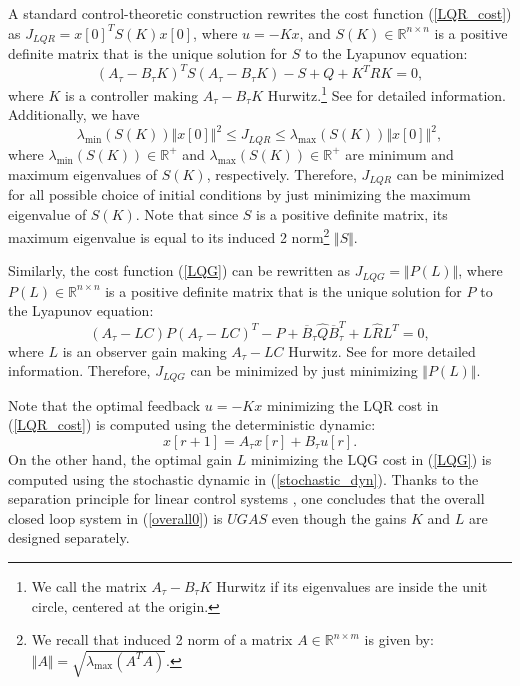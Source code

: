 \documentclass{amsart}
\numberwithin{equation}{section}
\newcommand{\R}{{\mathbb{R}}}
\begin{document}
A standard control-theoretic construction rewrites the cost function (\ref{LQR_cost}) as $J_{LQR}=x[0]^T S(K)x[0]$, where $u=-Kx$, and $S(K)\in\mathbb{R}^{n\times n}$ is a positive definite matrix that is the unique solution for $S$ to the Lyapunov equation:
\begin{equation}\label{lyapunov}
\left(A_\tau-B_\tau K\right)^TS\left(A_\tau-B_\tau K\right)-S+Q+K^TRK=0,
\end{equation}
where $K$ is a controller making $A_\tau-B_\tau K$ Hurwitz.\footnote{
We call the matrix $A_\tau-B_\tau K$ Hurwitz if its eigenvalues are inside the unit circle, centered at the origin.} 
See \cite{joao} for detailed information. Additionally, we have
\begin{equation}
\lambda_{\min}(S(K))\Vert{x[0]}\Vert^2\leq{J_{LQR}}\leq\lambda_{\max}(S(K))\Vert{x[0]}\Vert^2,
\end{equation}
where $\lambda_{\min}(S(K))\in\R^+$ and $\lambda_{\max}(S(K))\in\R^+$ are minimum and maximum eigenvalues of $S(K)$, respectively. 
Therefore, $J_{LQR}$ can be minimized for all possible choice of initial conditions by just minimizing the maximum eigenvalue of $S(K)$. Note that since $S$ is a positive definite matrix, its maximum eigenvalue is equal to its induced 2 norm\footnote{We recall that induced 2 norm of a matrix $A\in\R^{n\times{m}}$ is given by: $\Vert{A}\Vert=\sqrt{\lambda_{\max}\left(A^TA\right)}$.} $\Vert{S}\Vert$.  

Similarly, the cost function (\ref{LQG}) can be rewritten as $J_{LQG}=\Vert{P(L)}\Vert$, where $P(L)\in\mathbb{R}^{n\times n}$ is a positive definite matrix that is the unique solution for $P$ to the Lyapunov equation:
\begin{equation}\label{lyapunov1}
\left(A_\tau-LC\right)P\left(A_\tau-LC\right)^T-P+\overline{B}_\tau\widehat{Q}\overline{B}_\tau^T+L\widehat{R}L^T=0,
\end{equation}
where $L$ is an observer gain making $A_\tau-LC$ Hurwitz. See \cite{joao} for more detailed information. Therefore, $J_{LQG}$ can be minimized by just minimizing $\Vert P(L)\Vert$.

Note that the optimal feedback $u=-Kx$ minimizing the LQR cost in (\ref{LQR_cost}) is computed using the deterministic dynamic: $$x[r+1]=A_\tau x[r]+B_\tau u[r].$$ On the other hand, the optimal gain $L$ minimizing the LQG cost in (\ref{LQG}) is computed using the stochastic dynamic in (\ref{stochastic_dyn}). Thanks to the separation principle for linear control systems \cite{joao}, one concludes that the overall closed loop system in (\ref{overall0}) is $UGAS$ even though the gains $K$ and $L$ are designed separately.
\end{document}

